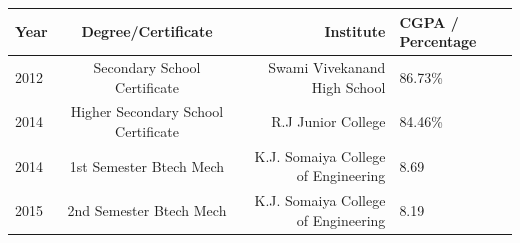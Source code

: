\documentclass[letterpaper,11pt]{article}
\begin{document}
\begin{table}[h!]
	\begin{center}
		\begin{tabular}{l|c|r|l} %
			\hspace{0.2cm}\textbf{Year}\hspace{0.2cm} &\hspace{0.2cm} \textbf{Degree/Certificate}\hspace{0.2cm} &\hspace{0.2cm} \textbf{Institute}\hspace{2.3cm} &\hspace{0.2cm} \textbf{CGPA / Percentage}\hspace{0.2cm}\\
			\hline
			2012 & \hspace{0.2cm} Secondary School Certificate \hspace{0.2cm} & \hspace{0.2cm}Swami Vivekanand High School\hspace{1.7cm} & \hspace{1.2cm} 86.73\% \hspace{0.2cm}\\
			2014 & \hspace{0.2cm} Higher Secondary School Certificate \hspace{0.2cm} & \hspace{0.2cm}R.J Junior College\hspace{1.7cm} & \hspace{1.2cm} 84.46\% \hspace{0.2cm}\\
			2014 & \hspace{0.2cm} 1st Semester Btech Mech \hspace{0.2cm} & \hspace{0.2cm}K.J. Somaiya College of Engineering\hspace{0.2cm} & \hspace{1.2cm} 8.69 \hspace{0.2cm}\\
			2015 & \hspace{0.2cm} 2nd Semester Btech Mech \hspace{0.2cm} & \hspace{0.2cm}K.J. Somaiya College of Engineering\hspace{0.2cm} & \hspace{1.2cm} 8.19 \hspace{0.2cm}\\

\end{tabular}
\end{center}
\end{table}
\end{document}
